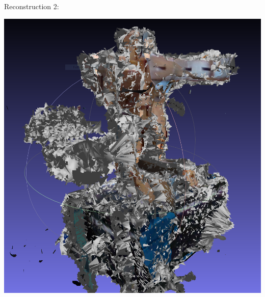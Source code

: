 \begin{frame}[allowframebreaks]
\framebreak

Reconstruction 2:
\begin{center}
\includegraphics[scale=0.15]{img/cube_man_reconstruction2.PNG}
\end{center}

\end{frame}
